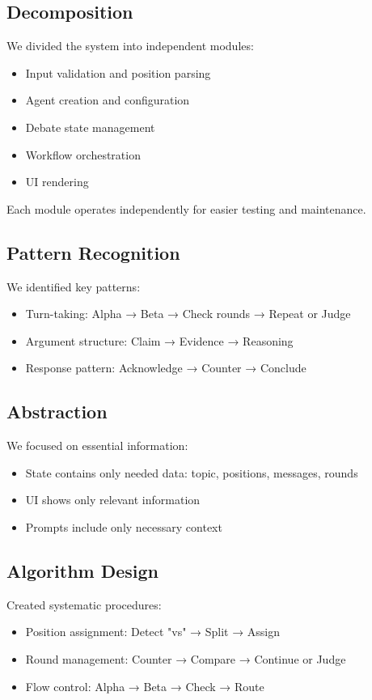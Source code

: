 \documentclass[conference]{IEEEtran}
\begin{document}
\subsection{Decomposition}

We divided the system into independent modules:
\begin{itemize}
\item Input validation and position parsing
\item Agent creation and configuration
\item Debate state management
\item Workflow orchestration
\item UI rendering
\end{itemize}

Each module operates independently for easier testing and maintenance.

\subsection{Pattern Recognition}

We identified key patterns:
\begin{itemize}
\item Turn-taking: Alpha → Beta → Check rounds → Repeat or Judge
\item Argument structure: Claim → Evidence → Reasoning
\item Response pattern: Acknowledge → Counter → Conclude
\end{itemize}

\subsection{Abstraction}

We focused on essential information:
\begin{itemize}
\item State contains only needed data: topic, positions, messages, rounds
\item UI shows only relevant information
\item Prompts include only necessary context
\end{itemize}

\subsection{Algorithm Design}

Created systematic procedures:
\begin{itemize}
\item Position assignment: Detect "vs" → Split → Assign
\item Round management: Counter → Compare → Continue or Judge
\item Flow control: Alpha → Beta → Check → Route
\end{itemize}
\end{document}
